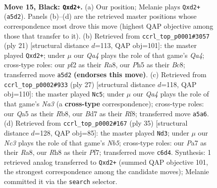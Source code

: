 \documentclass[11pt]{article}
\begin{document}
\begin{figure}[p]
\label{fig:thought-m27}
\end{figure}

\clearpage

\begin{figure}[p]\centering
\begin{subfigure}{0.46\textwidth}\centering
\resizebox{\linewidth}{!}{%
\newchessgame
\chessboard[
  setfen={2kr1bnr/pp1b4/2n1p1p1/qP1pP1Pp/3P4/P4N2/3Q1P2/RNB1KB1R b KQ - 2 15},
  showmover=false,
  pgfstyle=straightmove, color=movearrow, markmove={a5-d2}
]}
\caption{}
\end{subfigure}\hfill
\begin{subfigure}{0.46\textwidth}\centering
\resizebox{\linewidth}{!}{%
\newchessgame
\chessboard[
  setfen={r1b1k2r/3nbppp/p1n1p3/qpPpP3/5P1P/4BN2/PPPQN1P1/R3KB1R b KQkq - 2 11},
  showmover=false,
  pgfstyle=straightmove, color=movearrow, markmove={a5-d2}
]}
\caption{}
\end{subfigure}
\\[4pt]
\begin{subfigure}{0.46\textwidth}\centering
\resizebox{\linewidth}{!}{%
\newchessgame
\chessboard[
  setfen={1rb2rk1/p4pbp/n2p1np1/1B1Pp1B1/Pq2P2P/2N2P2/1P1Q2P1/1R2K1NR b K - 0 14},
  showmover=false,
  pgfstyle=straightmove, color=movearrow, markmove={a6-c5}
]}
\caption{}
\end{subfigure}\hfill
\begin{subfigure}{0.46\textwidth}\centering
\resizebox{\linewidth}{!}{%
\newchessgame
\chessboard[
  setfen={r1r3k1/4ppb1/3p1npp/P2P4/Rnp1P1qP/2N2N2/1P2QPPB/5RK1 b - - 1 18},
  showmover=false,
  pgfstyle=straightmove, color=movearrow, markmove={b4-d3}
]}
\caption{}
\end{subfigure}
\caption{\textbf{Move 15, Black: \texttt{Qxd2+}.} (a) Our position; Melanie plays \texttt{Qxd2+} (\texttt{a5d2}). Panels (b)--(d) are the retrieved master positions whose correspondence most drove this move (highest QAP objective among those that transfer to it). (b) Retrieved from \texttt{ccrl\_top\_p0001\#3057} (ply 21) [structural distance $d$=113, QAP obj=101]: the master played \texttt{Qxd2+}; under $\mu$ our \emph{Qa4} plays the role of that game's \emph{Qa4}; cross-type roles: our \emph{p}f2 as their \emph{R}a8, our \emph{P}h5 as their \emph{B}c8; transferred move \texttt{a5d2} \textbf{(endorses this move)}. (c) Retrieved from \texttt{ccrl\_top\_p0002\#933} (ply 27) [structural distance $d$=118, QAP obj=110]: the master played \texttt{Nc5}; under $\mu$ our \emph{Qa4} plays the role of that game's \emph{Na3} (a \textbf{cross-type} correspondence); cross-type roles: our \emph{Q}a5 as their \emph{R}b8, our \emph{B}d7 as their \emph{R}f8; transferred move \texttt{a5a6}. (d) Retrieved from \texttt{ccrl\_top\_p0002\#167} (ply 35) [structural distance $d$=128, QAP obj=85]: the master played \texttt{Nd3}; under $\mu$ our \emph{Nc3} plays the role of that game's \emph{Nb5}; cross-type roles: our \emph{P}a7 as their \emph{R}a8, our \emph{R}h8 as their \emph{P}f7; transferred move \texttt{c6d4}. Synthesis: 1 retrieved analog transferred to \texttt{Qxd2+} (summed QAP objective 101, the strongest correspondence among the candidate moves); Melanie committed it via the \texttt{search} selector.}

\end{figure}
\end{document}
